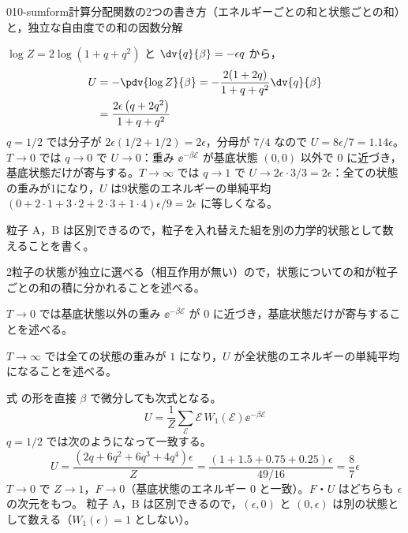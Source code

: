 \documentclass[uplatex,dvipdfmx,a4paper,11pt]{jsarticle}
\begin{document}
\begin{mondai}{010-sumform}{計算}{分配関数の2つの書き方（エネルギーごとの和と状態ごとの和）と，独立な自由度での和の因数分解}
\begin{tadashii}
 $\log Z=2\log(1+q+q^{2})$ と $\dv{q}{\beta}=-\epsilon q$ から，
\begin{align*}
U&=-\pdv{\log Z}{\beta}=-\frac{2(1+2q)}{1+q+q^{2}}\dv{q}{\beta}\\
&=\frac{2\epsilon\left(q+2q^{2}\right)}{1+q+q^{2}}
\end{align*}
$q=1/2$ では分子が $2\epsilon(1/2+1/2)=2\epsilon$，分母が $7/4$ なので $U=8\epsilon/7=\num{1.14}\epsilon$。
$T\to0$ では $q\to0$ で $U\to0$：重み $\ee^{-\beta\mathcal{E}}$ が基底状態 $(0,0)$ 以外で 0 に近づき，基底状態だけが寄与する。$T\to\infty$ では $q\to1$ で $U\to2\epsilon\cdot3/3=2\epsilon$：全ての状態の重みが1になり，$U$ は9状態のエネルギーの単純平均 $(0+2\cdot1+3\cdot2+2\cdot3+1\cdot4)\epsilon/9=2\epsilon$ に等しくなる。
\begin{ronten}
  \item {} 粒子 A，B は区別できるので，粒子を入れ替えた組を別の力学的状態として数えることを書く。
  \item {} 2粒子の状態が独立に選べる（相互作用が無い）ので，状態についての和が粒子ごとの和の積に分かれることを述べる。
  \item {} $T\to0$ では基底状態以外の重み $\ee^{-\beta\mathcal{E}}$ が $0$ に近づき，基底状態だけが寄与することを述べる。
  \item {} $T\to\infty$ では全ての状態の重みが $1$ になり，$U$ が全状態のエネルギーの単純平均になることを述べる。
\end{ronten}
\kenzan 式 の形を直接 $\beta$ で微分しても次式となる。
\[U=\frac{1}{Z}\sum_{\mathcal{E}}\mathcal{E}\,W_{1}(\mathcal{E})\ee^{-\beta\mathcal{E}}\]
$q=1/2$ では次のようになって一致する。
\[U=\frac{(2q+6q^{2}+6q^{3}+4q^{4})\epsilon}{Z}=\frac{(1+\num{1.5}+\num{0.75}+\num{0.25})\epsilon}{49/16}=\frac{8}{7}\epsilon\]
$T\to0$ で $Z\to1$，$F\to0$（基底状態のエネルギー 0 と一致）。$F$・$U$ はどちらも $\epsilon$ の次元をもつ。
\tsumazuki 粒子 A，B は区別できるので，$(\epsilon,0)$ と $(0,\epsilon)$ は別の状態として数える（$W_{1}(\epsilon)=1$ としない）。
\end{tadashii}
\end{mondai}
\end{document}
